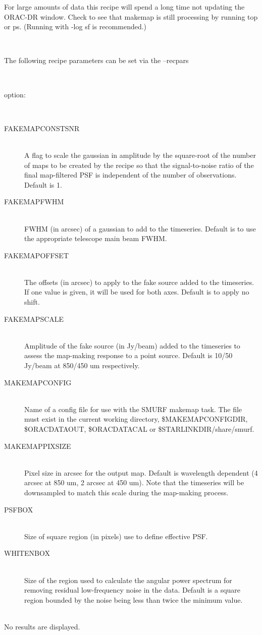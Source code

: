 \documentclass[twoside,11pt]{article}
\renewcommand{\_}{\texttt{\symbol{95}}}
\newcommand{\sstsubsection}[1]{ \item[{#1}] \mbox{} \\}
\newcommand{\sstdiytopic}[2]{\item[{\hspace{-0.35em}#1\hspace{-0.35em}:}]
\mbox{} \\[1.3ex] #2}
\newcommand{\sstdiylist}[2]{
   \item[#1:] \mbox{} \\
   \vspace{-3.5ex}
   \begin{description}
      #2
   \end{description}
}
\newcommand{\sstitem}{\item}
\newcommand{\sstsubsection}[1]{\item[{#1}]}
\newcommand{\sstdiytopic}[2]{\item[{#1}] #2 }
\newcommand{\sstitem}{\item}
\begin{document}
{{{         \sstitem
         For large amounts of data this recipe will spend a long time
         not updating the ORAC-DR window. Check to see that makemap is
         still processing by running top or ps. (Running with -log sf is
         recommended.)
      }
   }
   \sstdiylist{
      Available Parameters
   }{
      \sstsubsection{
         The following recipe parameters can be set via the --recpars
      }{
      }
      \sstsubsection{
         option:
      }{
      }
      \sstsubsection{
         FAKEMAP\_CONSTSNR
      }{
         A flag to scale the gaussian in amplitude by the square-root of
         the number of maps to be created by the recipe so that the
         signal-to-noise ratio of the final map-filtered PSF is
         independent of the number of observations. Default is 1.
      }
      \sstsubsection{
         FAKEMAP\_FWHM
      }{
         FWHM (in arcsec) of a gaussian to add to the timeseries.
         Default is to use the appropriate telescope main beam FWHM.
      }
      \sstsubsection{
         FAKEMAP\_OFFSET
      }{
         The offsets (in arcsec) to apply to the fake source added to
         the timeseries. If one value is given, it will be used for both
         axes. Default is to apply no shift.
      }
      \sstsubsection{
         FAKEMAP\_SCALE
      }{
         Amplitude of the fake source (in Jy/beam) added to the
         timeseries to assess the map-making response to a point source.
         Default is 10/50 Jy/beam at 850/450 um respectively.
      }
      \sstsubsection{
         MAKEMAP\_CONFIG
      }{
         Name of a config file for use with the SMURF makemap task. The
         file must exist in the current working directory,
         \$MAKEMAP\_CONFIG\_DIR, \$ORAC\_DATA\_OUT, \$ORAC\_DATA\_CAL or
         \$STARLINK\_DIR/share/smurf.
      }
      \sstsubsection{
         MAKEMAP\_PIXSIZE
      }{
         Pixel size in arcsec for the output map. Default is wavelength
         dependent (4 arcsec at 850 um, 2 arcsec at 450 um). Note that
         the timeseries will be downsampled to match this scale during
         the map-making process.
      }
      \sstsubsection{
         PSF\_BOX
      }{
         Size of square region (in pixels) use to define effective PSF.
      }
      \sstsubsection{
         WHITEN\_BOX
      }{
         Size of the region used to calculate the angular power spectrum
         for removing residual low-frequency noise in the data. Default
         is a square region bounded by the noise being less than twice
         the minimum value.
      }
   }
   \sstdiytopic{
      Display
   }{
      No results are displayed.
   }
}
\end{document}
